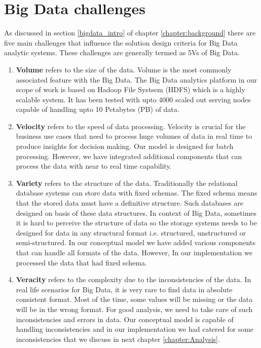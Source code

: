 \section{Big Data challenges}
As discussed in section \ref{bigdata_intro} of chapter \ref{chapter:background} there are five main challenges that influence the solution design criteria for Big Data analytic systems. These challenges are generally termed as 5Vs of Big Data.
\begin{enumerate}
\item \textbf{Volume} refers to the size of the data. Volume is the most commonly associated feature with the Big Data. The Big Data analytics platform in our scope of work is based on Hadoop File Systsem (HDFS) which is a highly scalable system. It has been tested with upto 4000 scaled out serving nodes capable of handling upto 10 Petabytes (PB) of data.
\item \textbf{Velocity} refers to the speed of data processing. Velocity is crucial for the business use cases that need to process huge volumes of data in real time to produce insights for decision making. Our model is designed for batch processing. However, we have integrated additional components that can process the data with near to real time capability.
\item \textbf{Variety} refers to the structure of the data. Traditionally the relational database systems can store data with fixed schemas. The fixed schema means that the stored data must have a definitive structure. Such databases are designed on basis of these data structures. In context of Big Data, sometimes it is hard to perceive the structure of data so the storage systems needs to be designed for data in any structural format i.e. structured, unstructured or semi-structured. In our conceptual model we have added various components that can handle all formats of the data. However, In our implementation we processed the data that had fixed schema. 
\item \textbf{Veracity} refers to the complexity due to the inconsistencies of the data. In real life scenarios for Big Data, it is very rare to find data in absolute consistent format. Most of the time, some values will be missing or the data will be in the wrong format. For good analysis, we need to take care of such inconsistencies and errors in data. Our conceptual model is capable of handling inconsistencies and in our implementation we had catered for some inconsistencies that we discuss in next chapter \ref{chapter:Analysis}. 

\end{enumerate}
